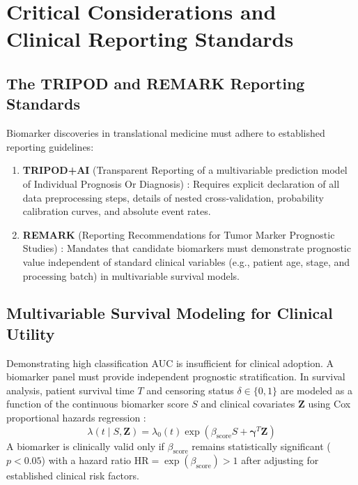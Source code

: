 \documentclass[11pt,twoside,openright]{book}
\begin{document}
\section{Critical Considerations and Clinical Reporting Standards}

\subsection{The TRIPOD and REMARK Reporting Standards}

Biomarker discoveries in translational medicine must adhere to established reporting guidelines:
\begin{enumerate}
    \item \textbf{TRIPOD+AI} (Transparent Reporting of a multivariable prediction model of Individual Prognosis Or Diagnosis) \cite{collins2015transparent, collins2024tripod}: Requires explicit declaration of all data preprocessing steps, details of nested cross-validation, probability calibration curves, and absolute event rates.
    \item \textbf{REMARK} (Reporting Recommendations for Tumor Marker Prognostic Studies) \cite{mcshane2005reporting}: Mandates that candidate biomarkers must demonstrate prognostic value independent of standard clinical variables (e.g., patient age, stage, and processing batch) in multivariable survival models.
\end{enumerate}

\subsection{Multivariable Survival Modeling for Clinical Utility}

Demonstrating high classification AUC is insufficient for clinical adoption. A biomarker panel must provide independent prognostic stratification. In survival analysis, patient survival time $T$ and censoring status $\delta \in \{0, 1\}$ are modeled as a function of the continuous biomarker score $S$ and clinical covariates $\mathbf{Z}$ using Cox proportional hazards regression \cite{cox1972regression}:
\begin{equation}
\lambda(t \mid S, \mathbf{Z}) = \lambda_0(t) \exp\left( \beta_{\text{score}} S + \boldsymbol{\gamma}^T \mathbf{Z} \right)
\label{eq:cox_model}
\end{equation}
A biomarker is clinically valid only if $\beta_{\text{score}}$ remains statistically significant ($p < 0.05$) with a hazard ratio $\text{HR} = \exp(\beta_{\text{score}}) > 1$ after adjusting for established clinical risk factors.
\end{document}
